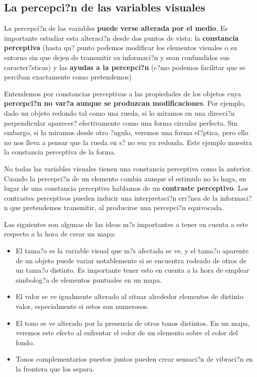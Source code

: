 \subsection{La percepci?n de las variables visuales}

La percepci?n de las variables \textbf{puede verse alterada por el medio}. Es importante estudiar esta alteraci?n desde dos puntos de vista: la \textbf{constancia perceptiva} (hasta qu? punto podemos modificar los elementos visuales o su entorno sin que dejen de transmitir su informaci?n y sean confundidos sus caracter?sticas) y las \textbf{ayudas a la percepci?n} (c?mo podemos facilitar que se perciban exactamente como pretendemos)

Entendemos por constancias perceptivas a las propiedades de los objetos cuya \textbf{percepci?n no var?a aunque se produzcan modificaciones}. Por ejemplo, dado un objeto redondo tal como una rueda, si lo miramos en una direcci?n perpendicular aparecer? efectivamente como una forma circular perfecta. Sin embargo, si la miramos desde otro ?ngulo, veremos una forma el?ptica, pero ello no nos lleva a pensar que la rueda en s? no sea ya redonda. Este ejemplo muestra la constancia perceptiva de la forma.

No todas las variables visuales tienen una constancia perceptiva como la anterior. Cuando la percepci?n de un elemento cambia aunque el estimulo no lo haga, en lugar de una constancia perceptiva hablamos de un \textbf{contraste perceptivo}. Los contrastes perceptivos pueden inducir una interpretaci?n err?nea de la informaci?n que pretendemos transmitir, al producirse una percepci?n equivocada.

Las siguientes son algunas de las ideas m?s importantes a tener en cuenta a este respecto a la hora de crear un mapa:

\begin{itemize}
	\item El tama?o es la variable visual que m?s afectada se ve, y el tama?o aparente de un objeto puede variar notablemente si se encuentra rodeado de otros de un tama?o distinto. Es importante tener esto en cuenta a la hora de emplear simbolog?a de elementos puntuales en un mapa.	
	\item El valor se ve igualmente alterado al situar alrededor elementos de distinto valor, especialmente si estos son numerosos.
	\item El tono se ve alterado por la presencia de otros tonos distintos. En un mapa, veremos este efecto al enfrentar el color de un elemento sobre el color del fondo. 
	\item Tonos complementarios puestos juntos pueden crear sensaci?n de vibraci?n en la frontera que los separa.
\end{itemize}

